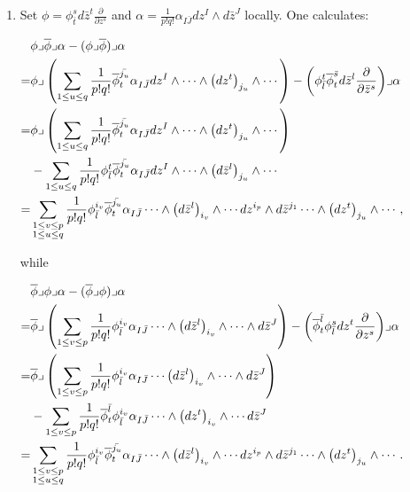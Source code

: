 \documentclass[12pt]{amsart}
\numberwithin{equation}{section}
\newcommand{\dz}{d \bar{z}}
\newcommand{\pz}{\partial\bar{z}}
\newcommand{\w}{\wedge}
\renewcommand{\1}{\mathds{1}}
\newcommand{\lc}{\lrcorner}
\newcommand{\lk}{\left(}
\newcommand{\rk}{\right)}
\renewcommand{\>}{\rightarrow}
\newcommand{\p}{\partial}
\def\p{\partial}
\def\w{\wedge}
\begin{document}
\begin{enumerate}
\item \quad Set $\phi = \phi^s_{\bar{t}} \dz^t \frac{\p}{\p z^s}$ and
$\alpha=\frac{1}{p!q!} \alpha_{I \bar{J}} dz^{I} \w \dz^{J}$
locally. One calculates:

 $\begin{aligned} & \phi \lc
\overline{\phi} \lc \alpha -
(\phi \lc \overline{\phi}) \lc \alpha \\
=& \phi \lc \lk \sum_{1 \leq u \leq q} \frac{1}{p!q!}
\overline{\phi}^{\bar{j_u}}_t \alpha_{I\bar{J}} dz^{I} \w \cdots \w
\big(dz^t\big)_{j_u} \w \cdots \rk
- \lk \phi^t_{\bar{l}} \overline{\phi}^{\bar{s}}_t \dz^l \frac{\p}{\pz^s} \rk \lc \alpha \\
=& \phi \lc \lk \sum_{1 \leq u \leq q} \frac{1}{p!q!}
\overline{\phi}^{\bar{j_u}}_t \alpha_{I\bar{J}} dz^{I} \w \cdots
\w \big(dz^t\big)_{j_u} \w \cdots \rk \\
 & - \sum_{1 \leq u \leq q} \frac{1}{p!q!} \phi^t_{\bar{l}}
\overline{\phi}^{\bar{j_u}}_t \alpha_{I\bar{J}} dz^{I} \w \cdots
\w \big(\dz^l\big)_{j_u} \w \cdots  \\
=& \sum_{\begin{subarray}{c} 1 \leq v \leq p \\ 1 \leq u \leq
q\end{subarray}} \frac{1}{p!q!} \phi^{i_v}_{\bar{l}}
\overline{\phi}^{\bar{j_u}}_t \alpha_{I\bar{J}} \cdots \w
\big(\dz^l\big)_{i_{v}} \w \cdots dz^{i_p} \w \dz^{j_1} \cdots \w
\big(dz^t\big)_{j_u} \w \cdots,
\end{aligned}$

while

 $\begin{aligned} & \overline{\phi} \lc \phi \lc
\alpha - (\overline{\phi}
\lc \phi) \lc \alpha \\
=& \overline{\phi} \lc \lk \sum_{1 \leq v \leq p} \frac{1}{p!q!}
\phi^{i_v}_{\bar{l}} \alpha_{I\bar{J}} \cdots \w
\big(\dz^l\big)_{i_v} \w \cdots \w \dz^{J} \rk
- \lk \overline{\phi}^{\bar{l}}_{t} \phi^{s}_{\bar{l}} dz^t \frac{\p}{\p z^s} \rk \lc \alpha \\
=& \overline{\phi} \lc \lk \sum_{1 \leq v \leq p} \frac{1}{p!q!}
\phi^{i_v}_{\bar{l}} \alpha_{I\bar{J}} \cdots
\big(\dz^l\big)_{i_v} \w \cdots \w \dz^{J} \rk \\
 & - \sum_{1 \leq v \leq p} \frac{1}{p!q!}
\overline{\phi}^{\bar{l}}_{t} \phi^{i_v}_{\bar{l}}
\alpha_{I\bar{J}} \cdots \w \big(dz^t\big)_{i_v} \w \cdots  \dz^{J} \\
=& \sum_{\begin{subarray}{c} 1 \leq v \leq p \\ 1 \leq u \leq
q\end{subarray}} \frac{1}{p!q!} \phi^{i_v}_{\bar{l}}
\overline{\phi}^{\bar{j_u}}_t \alpha_{I\bar{J}} \cdots \w
\big(\dz^l\big)_{i_v} \w \cdots dz^{i_p} \w \dz^{j_1} \cdots \w
\big(dz^t\big)_{j_u} \w \cdots.
\end{aligned}$



\end{enumerate}
\end{document}
